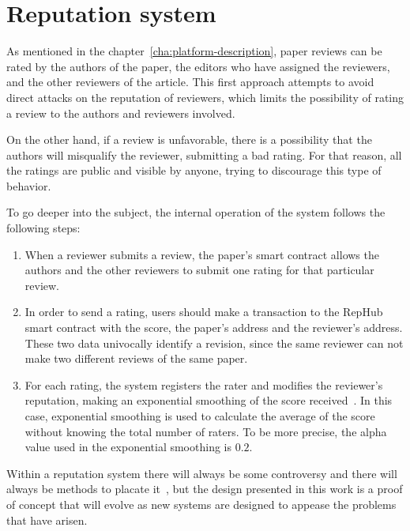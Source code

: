 \section{Reputation system}
\label{rep:system}

As mentioned in the chapter~\ref{cha:platform-description}, paper reviews can be
rated by the authors of the paper, the editors who have assigned the reviewers,
and the other reviewers of the article. This first approach attempts to avoid
direct attacks on the reputation of reviewers, which limits the possibility of
rating a review to the authors and reviewers involved.

On the other hand, if a review is unfavorable, there is a possibility that the
authors will misqualify the reviewer, submitting a bad rating. For that reason,
all the ratings are public and visible by anyone, trying to discourage this type
of behavior.

To go deeper into the subject, the internal operation of the system follows the
following steps:

\begin{enumerate}
\item When a reviewer submits a review, the paper's smart contract allows the
  authors and the other reviewers to submit one rating for that particular
  review.
  
\item In order to send a rating, users should make a transaction to the RepHub
  smart contract with the score, the paper's address and the reviewer's address.
  These two data univocally identify a revision, since the same reviewer can not
  make two different reviews of the same paper.
  
\item For each rating, the system registers the rater and modifies the
  reviewer's reputation, making an exponential smoothing of the score
  received~\cite{gardner1985exponential}. In this case, exponential smoothing is
  used to calculate the average of the score without knowing the total number of
  raters. To be more precise, the alpha value used in the exponential smoothing
  is $0.2$.
\end{enumerate}

Within a reputation system there will always be some controversy and there will
always be methods to placate it~\cite{dellarocas2000immunizing}, but the design
presented in this work is a proof of concept that will evolve as new systems are
designed to appease the problems that have arisen.


